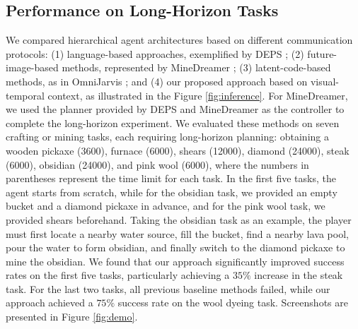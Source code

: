 \subsection{Performance on Long-Horizon Tasks}
We compared hierarchical agent architectures based on different communication protocols: (1) language-based approaches, exemplified by DEPS \citep{deps}; (2) future-image-based methods, represented by MineDreamer \citep{minedreamer}; (3) latent-code-based methods, as in OmniJarvis \citep{omnijarvis}; and (4) our proposed approach based on visual-temporal context, as illustrated in the Figure \ref{fig:inference}. 
For MineDreamer, we used the planner provided by DEPS and MineDreamer as the controller to complete the long-horizon experiment.
We evaluated these methods on seven crafting or mining tasks, each requiring long-horizon planning: obtaining a wooden pickaxe (3600), furnace (6000), shears (12000), diamond (24000), steak (6000), obsidian (24000), and pink wool (6000), where the numbers in parentheses represent the time limit for each task. In the first five tasks, the agent starts from scratch, while for the obsidian task, we provided an empty bucket and a diamond pickaxe in advance, and for the pink wool task, we provided shears beforehand. Taking the obsidian task as an example, the player must first locate a nearby water source, fill the bucket, find a nearby lava pool, pour the water to form obsidian, and finally switch to the diamond pickaxe to mine the obsidian. We found that our approach significantly improved success rates on the first five tasks, particularly achieving a $35\%$ increase in the steak task. For the last two tasks, all previous baseline methods failed, while our approach achieved a $75\%$ success rate on the wool dyeing task. Screenshots are presented in Figure \ref{fig:demo}. 

